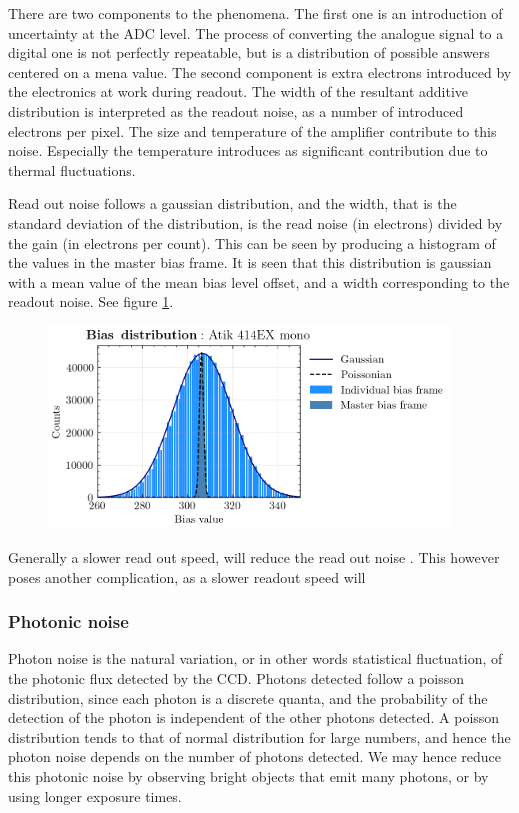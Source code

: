 \documentclass[../main.tex]{subfiles}
\begin{document}
	There are two components to the phenomena. The first one is an introduction of uncertainty at the ADC level. The process of converting the analogue signal to a digital one is not perfectly repeatable, but is a distribution of possible answers centered on a mena value.
	The second component is extra electrons introduced by the electronics at work during readout. The width of the resultant additive distribution is interpreted as the readout noise, as a number of introduced electrons per pixel.
	The size and temperature of the amplifier contribute to this noise. Especially the temperature introduces as significant contribution due to thermal fluctuations. 
	
	Read out noise follows a gaussian distribution, and the width, that is the standard deviation of the distribution, is the read noise (in electrons) divided by the gain (in electrons per count). This can be seen by producing a histogram of the values in the master bias frame. It is seen that this distribution is gaussian with a mean value of the mean bias level offset, and a width corresponding to the readout noise. See figure \ref{fig:rongauss}. 
	
	\begin{figure}[h!]
		\centering
		\includegraphics[width	=0.95\textwidth]{gauss_bias.png}
		\caption{}
		\label{fig:rongauss}
	\end{figure}
	
	Generally a slower read out speed, will reduce the read out noise \cite{handbookofccdastronomy}. This however poses another complication, as a slower readout speed will 
	
	\subsubsection{Photonic noise}
	Photon noise is the natural variation, or in other words statistical fluctuation, of the photonic flux detected by the CCD. Photons detected follow a poisson distribution, since each photon is a discrete quanta, and the probability of the detection of the photon is independent of the other photons detected. A poisson distribution tends to that of normal distribution for large numbers, and hence the photon noise depends on the number of photons detected. We may hence reduce this photonic noise by observing bright objects that emit many photons, or by using longer exposure times.
	
\end{document}
